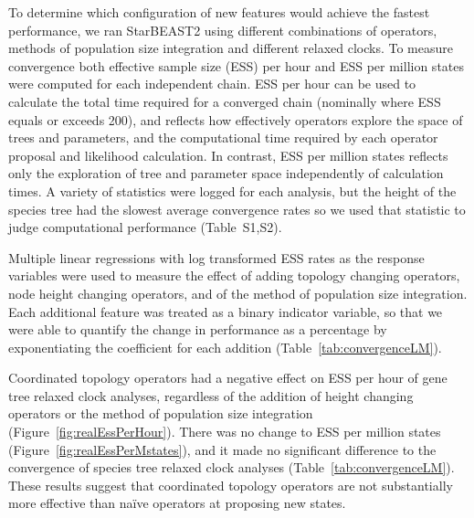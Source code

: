 \documentclass[12pt]{article}
\begin{document}
To determine which configuration of new features would achieve the fastest
performance, we ran StarBEAST2 using different combinations of operators,
methods of population size integration and different relaxed clocks. To measure
convergence both effective sample size (ESS) per hour and ESS per million states
were computed for each independent chain. ESS per hour can be used to calculate
the total time required for a converged chain (nominally where ESS equals or
exceeds 200), and reflects how effectively operators explore the space of trees
and parameters, and the computational time required by each operator proposal
and likelihood calculation. In contrast, ESS per million states reflects only
the exploration of tree and parameter space independently of calculation times.
A variety of statistics were logged for each analysis, but the height of the
species tree had the slowest average convergence rates so we used that statistic
to judge computational performance (Table~S1,S2).

Multiple linear regressions with log transformed ESS rates as the response
variables were used to measure the effect of adding topology changing operators,
node height changing operators, and of the method of population size
integration. Each additional feature was treated as a binary indicator variable, so that
we were able to quantify the change in performance as a percentage by
exponentiating the coefficient for each addition
(Table~\ref{tab:convergenceLM}).

Coordinated topology operators had a negative effect on ESS per hour of gene
tree relaxed clock analyses, regardless of the addition of height changing
operators or the method of population size integration
(Figure~\ref{fig:realEssPerHour}). There was no change to ESS per million states
(Figure~\ref{fig:realEssPerMstates}), and it made no significant difference to the
convergence of species tree relaxed clock analyses
(Table~\ref{tab:convergenceLM}). These results suggest that coordinated topology
operators are not substantially more effective than na\"ive operators at
proposing new states.
\end{document}
